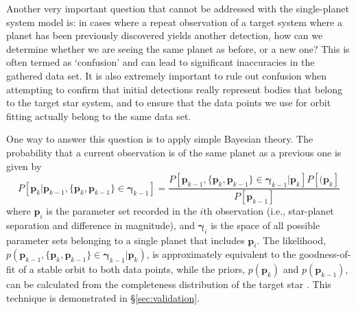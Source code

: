 Another very important question that cannot be addressed with the single-planet system model is: in cases where a repeat observation of a target system where a planet has been previously discovered yields another detection, how can we determine whether we are seeing the same planet as before, or a new one?  This is often termed as `confusion' and can lead to significant inaccuracies in the gathered data set.  It is also  extremely important to rule out confusion when attempting to  confirm that initial detections really represent bodies that belong to the target star system, and to ensure that the data points we use for orbit fitting actually belong to the same data set.

One way to answer this question is to apply simple Bayesian theory.  The probability that a current observation is of the same planet as a previous one is given by
\begin{equation}\label{eq:bayesMultiPlanet}
P\left[\mathbf{p}_k | \mathbf{p}_{k-1},  \{\mathbf{p}_k,\mathbf{p}_{k-1}\} \in \mathbf{\gamma}_{k-1}\right] = \frac{P\left[\mathbf{p}_{k-1},\{\mathbf{p}_k,\mathbf{p}_{k-1}\} \in \mathbf{\gamma}_{k-1} | \mathbf{p}_{k}\right] P\left[(\mathbf{p}_k\right]}{P\left[\mathbf{p}_{k-1}\right]}
\end{equation}
where $\mathbf{p}_i$ is the parameter set recorded in the $i$th observation (i.e., star-planet separation and difference in magnitude), and $\mathbf{\gamma}_i$ is the space of all possible parameter sets belonging to a single planet that includes $\mathbf{p}_i$.  The likelihood, $p(\mathbf{p}_{k-1},\{\mathbf{p}_k,\mathbf{p}_{k-1}\} \in \mathbf{\gamma}_{k-1} | \mathbf{p}_{k})$, is approximately equivalent to the goodness-of-fit of a stable orbit to both data points, while the priors, $p(\mathbf{p}_k)$ and $p(\mathbf{p}_{k-1})$, can be calculated from the completeness distribution of the target star \citep{savransky2010occulting}.  This technique is demonstrated in \S\ref{sec:validation}.

